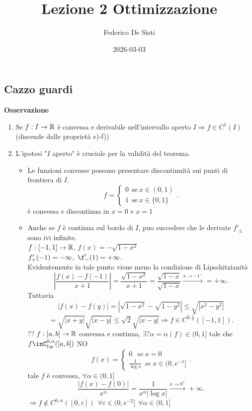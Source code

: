 \documentclass[12px]{article}
\title{Lezione 2 Ottimizzazione}
\date{2026-03-03}
\author{Federico De Sisti}
\begin{document}
	\maketitle
	\newpage
	\subsection{Cazzo guardi}
	\textbf{Osservazione}
	\begin{enumerate}
		\item Se $f:I \rightarrow \mathbb{R}$ è convessa e derivabile nell'intervallo aperto $I \Rightarrow f\in C^1(I)$ (discende dalle proprietà e)-f))
		\item L'ipotesi "$I$ aperto" è cruciale per la validità del teorema.
			\begin{itemize}
				\item Le funzioni convesse possono presentare discontinuità sui punti di frontiera di $I$.
					 \[
					f = \begin{cases}
						0 \ \ \text{se} \ x\in (0,1)\\
						1 \ \ \text{se} \ x\in \{0,1\}
					\end{cases}
					.\]  è convessa e discontinua in $x =0$ e $x=1$
				\item Anche se  $f$ è continua sul bordo di $ I$, puo succedere che le derivate $f'_\pm$ sono ivi infinite.\\
					$f:[-1,1] \rightarrow\mathbb{R}$, $f(x) = -\sqrt{1-x^2}$\\
					$f'_+(-1) = -\infty, \  \f'_-(1) = +\infty$.\\
					Evidentemente in tale punto viene meno la condizione di Lipschitzianità
					 \[
						 \left|\frac{f(x)-f(-1)}{x+1}\right| = \frac{\sqrt{1-x^2}}{x+1} = \frac{\sqrt{1-x}}{\sqrt{1-x}} \xrightarrow{x \rightarrow -1^+} = +\infty
					.\] 
					Tuttavia
					\[
						|f(x)-f(y)| = |\sqrt{1-x^2} - \sqrt{1 - y^2}|\leq\sqrt{|x^2-y^2|}
					\] 
					\[
						= \sqrt{|x+y|}\sqrt{|x-y|}\leq \sqrt 2\sqrt{|x-y|} \Rightarrow  f\in C^{0,\frac 12}([-1,1])
					.\] 
					?? $f:[a,b] \rightarrow \mathbb{R}$ convessa e continua, $\exists ? \alpha = \alpha(f)\in(0,1]$ tale che  $f\inC^{0,\alpha}_{lip}([a,b])$ NO \\
					\[
					f(x) = \begin{cases}
						0\ \ \ se \ x =0\\
						\frac 1{\log x} \ \ se \ x\in (0,e^{-1}]
					\end{cases}
					.\] 
					tale $f$ è convessa, $\forall \alpha\in(0,1]$ 
					\[
						\frac{|f(x)-f(0)|}{x^\alpha} = \frac{1}{x^\alpha|\log x|} \xrightarrow{x \rightarrow 0^+} +\infty
				.\] 
				$ \Rightarrow  f\not\in C^{0,\alpha}([0,\varepsilon])\ \ \forall \varepsilon \in(0,e^{-2}]\ \ \forall \alpha\in (0,1]$
			\end{itemize}
	\end{enumerate}
\end{document}
